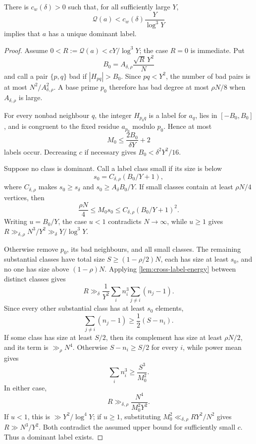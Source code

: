 \begin{proposition}
\label{prop:nondominant-forcing}
There is $c_w(\delta)>0$ such that, for all sufficiently large $Y$,
\[
 \mathcal Q(a)<c_w(\delta)\frac{Y}{\log^3Y}
\]
implies that $a$ has a unique dominant label.
\end{proposition}
\begin{proof}
Assume $0<R:=\mathcal Q(a)<cY/\log^3Y$; the case $R=0$ is immediate. Put
\[
 B_0=A_{\delta,\rho}\frac{\sqrt R\,Y^2}{N}
\]
and call a pair $\{p,q\}$ bad if $|H_{pq}|>B_0$. Since $pq<Y^2$, the number of bad pairs is at most $N^2/A_{\delta,\rho}^2$. A base prime $p_0$ therefore has bad degree at most $\rho N/8$ when $A_{\delta,\rho}$ is large.

For every nonbad neighbour $q$, the integer $H_{p_0q}$ is a label for $a_q$, lies in $[-B_0,B_0]$, and is congruent to the fixed residue $a_{p_0}$ modulo $p_0$. Hence at most
\[
 M_0\leq\frac{2B_0}{\delta Y}+2
\]
labels occur. Decreasing $c$ if necessary gives $B_0<\delta^2Y^2/16$.

Suppose no class is dominant. Call a label class small if its size is below
\[
 s_0=C_{\delta,\rho}(B_0/Y+1),
\]
where $C_{\delta,\rho}$ makes $s_0\geq s_\delta$ and $s_0\geq A_\delta B_0/Y$. If small classes contain at least $\rho N/4$ vertices, then
\[
 \frac{\rho N}{4}\leq M_0s_0\leq C_{\delta,\rho}(B_0/Y+1)^2.
\]
Writing $u=B_0/Y$, the case $u<1$ contradicts $N\to\infty$, while $u\geq1$ gives $R\gg_{\delta,\rho}N^3/Y^2\gg_\delta Y/\log^3Y$.

Otherwise remove $p_0$, its bad neighbours, and all small classes. The remaining substantial classes have total size $S\geq(1-\rho/2)N$, each has size at least $s_0$, and no one has size above $(1-\rho)N$. Applying \cref{lem:cross-label-energy} between distinct classes gives
\[
 R\gg_\delta\frac1{Y^2}\sum_i n_i^3\sum_{j\neq i}(n_j-1).
\]
Since every other substantial class has at least $s_0$ elements,
\[
 \sum_{j\neq i}(n_j-1)\geq\frac12(S-n_i).
\]
If some class has size at least $S/2$, then its complement has size at least $\rho N/2$, and its term is $\gg_\rho N^4$. Otherwise $S-n_i\geq S/2$ for every $i$, while power mean gives
\[
 \sum_i n_i^3\geq\frac{S^3}{M_0^2}.
\]
In either case,
\[
 R\gg_{\delta,\rho}\frac{N^4}{M_0^2Y^2}.
\]
If $u<1$, this is $\gg Y^2/\log^4Y$; if $u\geq1$, substituting $M_0^2\ll_{\delta,\rho}RY^2/N^2$ gives $R\gg N^3/Y^2$. Both contradict the assumed upper bound for sufficiently small $c$. Thus a dominant label exists.
\end{proof}


